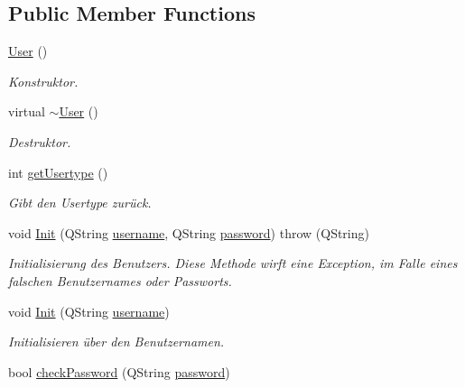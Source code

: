 \subsection*{Public Member Functions}
\begin{CompactItemize}
\item 
\hyperlink{class_user_4a0137053e591fbb79d9057dd7d2283d}{User} ()
\begin{CompactList}\small\item\em Konstruktor. \item\end{CompactList}\item 
virtual \hyperlink{class_user_c00b72ad64eb4149f7b21b9f5468c2b2}{$\sim$User} ()
\begin{CompactList}\small\item\em Destruktor. \item\end{CompactList}\item 
int \hyperlink{class_user_f6482cc57caa04a2c718fb059b2c1336}{getUsertype} ()
\begin{CompactList}\small\item\em Gibt den Usertype zurück. \item\end{CompactList}\item 
void \hyperlink{class_user_32b6c340b057ae716881248a3ee8f1e2}{Init} (QString \hyperlink{class_user_e4202de2b7974e92a55b913d20b03833}{username}, QString \hyperlink{class_user_c887622f22a898c097d156ad964be846}{password})  throw (QString)
\begin{CompactList}\small\item\em Initialisierung des Benutzers. Diese Methode wirft eine Exception, im Falle eines falschen Benutzernames oder Passworts. \item\end{CompactList}\item 
void \hyperlink{class_user_b99348b94c4fc390f50113c44111370f}{Init} (QString \hyperlink{class_user_e4202de2b7974e92a55b913d20b03833}{username})
\begin{CompactList}\small\item\em Initialisieren über den Benutzernamen. \item\end{CompactList}\item 
bool \hyperlink{class_user_f18e23aba10e99668b35c0b46dece9ae}{checkPassword} (QString \hyperlink{class_user_c887622f22a898c097d156ad964be846}{password})
\item 

\end{CompactItemize}
